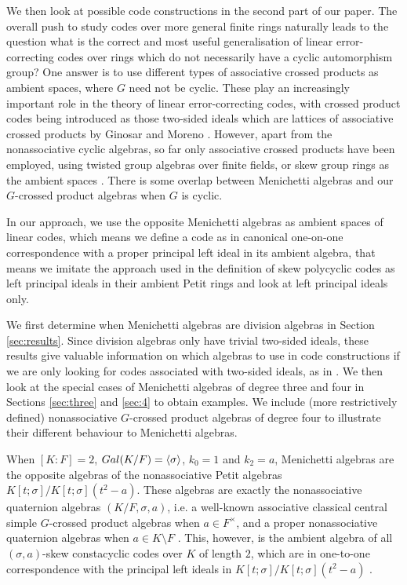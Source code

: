 \documentclass[11pt]{amsart}
\theoremstyle{plain}
\theoremstyle{definition}
\begin{document}
 We then look at possible code constructions in the second part of our paper. The overall push to study codes over more general finite rings naturally leads to the question what is the correct and most useful generalisation of linear error-correcting codes over rings which do not necessarily have a cyclic automorphism group? One answer is to use
different types of associative crossed products as ambient spaces, where $G$ need not be cyclic. These play an increasingly important role in
the theory of linear error-correcting codes, with crossed product codes being introduced as those two-sided ideals which are lattices of associative crossed products  by Ginosar and Moreno \cite{GM}. However, apart from the nonassociative cyclic algebras,
so far only associative crossed products have been employed, using twisted group algebras over finite fields, or skew group rings as the ambient spaces \cite{DW21, G, GM, SU25}. There is some overlap between Menichetti algebras and our $G$-crossed product algebras when $G$ is cyclic.

In our approach, we use the opposite Menichetti algebras as ambient spaces of linear codes, which means we define a code as in canonical one-on-one correspondence with a proper principal left ideal in its ambient algebra, that means we imitate the approach used in the definition of skew polycyclic codes as left principal ideals in their ambient Petit rings and look at left principal ideals only.

 We first determine when Menichetti algebras are division algebras in  Section  \ref{sec:results}. Since division algebras only have trivial two-sided ideals, these results give valuable information on which algebras to use in code constructions if we are only looking for codes associated with two-sided ideals, as in \cite{GM}. We then look at the special cases of Menichetti algebras of degree three and four  in Sections \ref{sec:three} and  \ref{sec:4} to obtain examples.
 We include  (more restrictively defined) nonassociative $G$-crossed product algebras of degree four to illustrate their different behaviour to  Menichetti algebras.

 When $[K:F]=2$, ${\rm Gal}(K/F)=\langle \sigma\rangle $, $k_0=1$ and $k_2=a$, Menichetti algebras are the opposite algebras of the nonassociative Petit algebras $K[t;\sigma]/K[t;\sigma](t^2-a)$.
 These algebras are exactly the nonassociative quaternion algebras $(K/F,\sigma,a)$, i.e. a well-known associative classical central simple $G$-crossed product algebras when $a\in F^\times$, and a proper nonassociative quaternion algebras when $a\in K\setminus F$ \cite{BP19}.
 This, however, is the ambient algebra of all  $(\sigma,a)$-skew constacyclic codes over $K$ of length $2$, which are in one-to-one correspondence with the  principal left ideals in $K[t;\sigma]/K[t;\sigma](t^2-a)$  \cite{Pum2017, Pum2025}.
\end{document}
